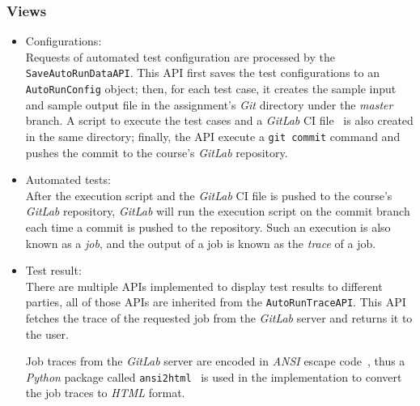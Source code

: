 \subsubsection{Views}
\begin{itemize}
    \item Configurations: \\
    Requests of automated test configuration are processed by the
    \texttt{Save\-Auto\-Run\-Data\-API}.
    This API first saves the test configurations to an \texttt{AutoRunConfig}
    object;
    then, for each test case, it creates the sample input and sample output
    file in the assignment's \emph{Git} directory under the \emph{master}
    branch.
    A script to execute the test cases and a \emph{GitLab} CI
    file~\cite{gitlabConfig} is also created in the same directory;
    finally, the API execute a \texttt{git commit} command and pushes the
    commit to the course's \emph{GitLab} repository.

    \item Automated tests: \\
    After the execution script and the \emph{GitLab} CI file is pushed to the
    course's \emph{GitLab} repository, \emph{GitLab} will run the execution
    script on the commit branch each time a commit is pushed to the repository.
    Such an execution is also known as a \emph{job}, and the output of a job
    is known as the \emph{trace} of a job.

    \item Test result: \\
    There are multiple APIs implemented to display test results to different
    parties, all of those APIs are inherited from the \texttt{AutoRunTraceAPI}.
    This API fetches the trace of the requested job from the \emph{GitLab}
    server and returns it to the user.

    Job traces from the \emph{GitLab} server are encoded in \emph{ANSI} escape
    code~\cite{ansi}, thus a \emph{Python} package called
    \texttt{ansi2html}~\cite{ansi2html}
    is used in the implementation to convert the job traces to \emph{HTML}
    format.
\end{itemize}

